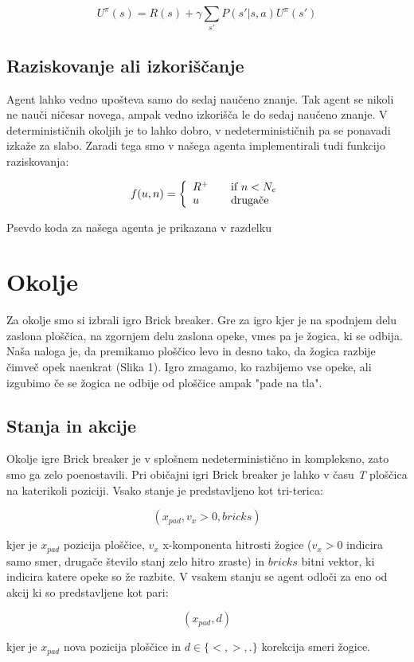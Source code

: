 \documentclass[a4paper]{article}
\begin{document}
\[ U^{\pi} (s) = R(s) + \gamma \sum_{s'} P(s' | s, a)  U^\pi (s') \]

\subsection{Raziskovanje ali izkoriščanje}
Agent lahko vedno upošteva samo do sedaj naučeno znanje. Tak agent se nikoli ne nauči ničesar novega, ampak vedno izkorišča le do sedaj naučeno znanje. V determinističnih okoljih je to lahko dobro, v nedeterminističnih pa se ponavadi izkaže za slabo. Zaradi tega smo v našega agenta implementirali tudi funkcijo raziskovanja:

\[ f(u, n) = \left\{
	\begin{array}{l l}
		R^+ & \quad \text{if $n$} < N_e\\
		u & \quad \text{drugače}
	\end{array}
\right.\]

Psevdo koda za našega agenta je prikazana v razdelku 

\section{Okolje}
Za okolje smo si izbrali igro Brick breaker. Gre za igro kjer je na spodnjem delu zaslona ploščica, na zgornjem delu zaslona opeke, vmes pa je žogica, ki se odbija. Naša naloga je, da premikamo ploščico levo in desno tako, da žogica razbije čimveč opek naenkrat (Slika 1). Igro zmagamo, ko razbijemo vse opeke, ali izgubimo če se žogica ne odbije od ploščice ampak "pade na tla". 

\subsection{Stanja in akcije}
Okolje igre Brick breaker je v splošnem nedeterministično in kompleksno, zato smo ga zelo poenostavili. Pri običajni igri Brick breaker je lahko v času \textit{T} ploščica na katerikoli poziciji. Vsako stanje je predstavljeno kot tri-terica:

\[
	(x_{pad}, v_x > 0, bricks)
\]

kjer je $x_{pad}$ pozicija ploščice, $v_x$ x-komponenta hitrosti žogice ($v_x>0$ indicira samo smer, drugače število stanj zelo hitro zraste) in $bricks$ bitni vektor, ki indicira katere opeke so že razbite.
V vsakem stanju se agent odloči za eno od akcij ki so predstavljene kot pari:

\[
(x_{pad}, d)
\]

kjer je $x_{pad}$ nova pozicija ploščice in $d \in \{<, >, .\}$ korekcija smeri žogice. 
\end{document}
